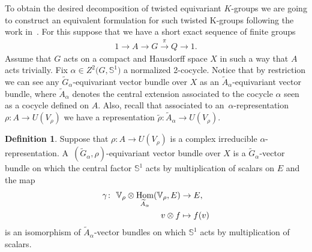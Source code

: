 \documentclass[11pt]{article}
\numberwithin{equation}{section}
\def\S{\mathbb{S}}
\def\V{\mathbb{V}}
\DeclareMathOperator{\Hom}{\textup{Hom}}
\theoremstyle{definition}
\newtheorem{Def}[Th]{Definition}
\numberwithin{equation}{section}
\begin{document}
To obtain the desired decomposition of twisted equivariant $K$-groups we are going to construct an equivalent
formulation for such twisted K-groups following the work in~\cite{GomezUribe}. For this suppose
that we have a short exact sequence of finite groups
\begin{gather*}
1\rightarrow A\rightarrow G\stackrel{\pi}{\rightarrow} Q\rightarrow 1.
\end{gather*}
Assume that $G$ acts on a compact and Hausdorff space $X$ in such a way that $A$ acts trivially.
Fix $\alpha\in Z^{2}\big(G,\S^{1}\big)$ a normalized 2-cocycle. Notice that by restriction we can
see any $\widetilde{G}_{\alpha}$-equivariant vector bundle over $X$ as an
$\widetilde{A}_{\alpha}$-equivariant vector bundle, where $\widetilde{A}_{\alpha}$ denotes the
central extension associated to the cocycle $\alpha$ seen as a cocycle defined on $A$.
Also, recall that associated to an~$\alpha$-representation $\rho\colon A \rightarrow U(V_{\rho})$ we have a representation
$\tilde{\rho}\colon \widetilde{A}_{\alpha} \rightarrow U(V_{\rho})$.

{\sloppy\begin{Def}
Suppose that $\rho\colon A \rightarrow U(V_{\rho})$ is a complex irreducible $\alpha$-representation.
A~$(\widetilde{G}_{\alpha}, \rho)$-equivariant vector bundle over $X$ is a
$\widetilde{G}_{\alpha}$-vector bundle on which the central factor $\S^{1}$ acts
by multiplication of scalars on $E$ and the map
\begin{align*}
\gamma\colon\ \V_{\rho}\otimes \Hom_{\widetilde{A}_{\alpha}}(\V_{\rho},E)&\rightarrow E,
\\
v\otimes f &\mapsto f(v)
\end{align*}
is an isomorphism of $\widetilde{A}_{\alpha}$-vector bundles on which $\S^{1}$ acts
by multiplication of scalars.
\end{Def}

}
\end{document}
